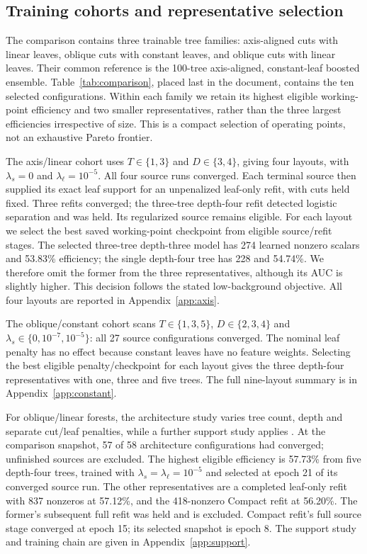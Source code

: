 \subsection{Training cohorts and representative selection}
\label{sec:cohorts}
The comparison contains three trainable tree families: axis-aligned cuts with
linear leaves, oblique cuts with constant leaves, and oblique cuts with linear
leaves. Their common reference is the 100-tree axis-aligned, constant-leaf
boosted ensemble. Table~\ref{tab:comparison}, placed last in the document,
contains the ten selected configurations. Within each family we retain its
highest eligible working-point efficiency and two smaller representatives,
rather than the three largest efficiencies irrespective of size. This is a
compact selection of operating points, not an exhaustive Pareto frontier.

The axis/linear cohort uses $T\in\{1,3\}$ and $D\in\{3,4\}$, giving four
layouts, with $\lambda_s=0$ and $\lambda_\ell=10^{-5}$. All four source runs
converged. Each terminal source then supplied its exact leaf support for an
unpenalized leaf-only refit, with cuts held fixed. Three refits converged; the
three-tree depth-four refit detected logistic separation and was held. Its
regularized source remains eligible. For each layout we select the best saved
working-point checkpoint from eligible source/refit stages. The selected
three-tree depth-three model has 274 learned nonzero scalars and 53.83\%
efficiency; the single depth-four tree has 228 and 54.74\%. We therefore omit
the former from the three representatives, although its AUC is slightly
higher. This decision follows the stated low-background objective. All four
layouts are reported in Appendix~\ref{app:axis}.

The oblique/constant cohort scans $T\in\{1,3,5\}$, $D\in\{2,3,4\}$ and
$\lambda_s\in\{0,10^{-7},10^{-5}\}$: all 27 source configurations converged.
The nominal leaf penalty has no effect because constant leaves have no feature
weights. Selecting the best eligible penalty/checkpoint for each layout gives
the three depth-four representatives with one, three and five trees. The full
nine-layout summary is in Appendix~\ref{app:constant}.

For oblique/linear forests, the architecture study varies tree count, depth
and separate cut/leaf penalties, while a further support study applies
\SFR{}. At the comparison snapshot, 57 of 58 architecture configurations had
converged; unfinished sources are excluded. The highest eligible efficiency
is 57.73\% from five depth-four trees, trained with
$\lambda_s=\lambda_\ell=10^{-5}$ and selected at epoch 21 of its converged
source run. The other representatives are a completed leaf-only refit with
837 nonzeros at 57.12\%, and the 418-nonzero Compact refit at 56.20\%.
The former's subsequent full refit was held and is excluded. Compact refit's
full source stage converged at epoch 15; its selected snapshot is epoch 8.
The support study and training chain are given in Appendix~\ref{app:support}.

